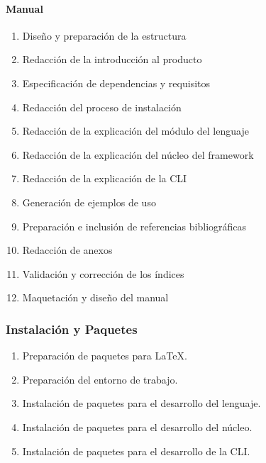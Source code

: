 \paragraph{Manual}
\begin{enumerate}
    \item Diseño y preparación de la estructura
    \item Redacción de la introducción al producto
    \item Especificación de dependencias y requisitos
    \item Redacción del proceso de instalación

    \item Redacción de la explicación del módulo del lenguaje
    \item Redacción de la explicación del núcleo del framework
    \item Redacción de la explicación de la CLI

    \item Generación de ejemplos de uso %

    \item Preparación e inclusión de referencias bibliográficas %
    \item Redacción de anexos %
    \item Validación y corrección de los índices %
    \item Maquetación y diseño del manual %

\end{enumerate}

\subsubsection{Instalación y Paquetes}
\begin{enumerate}
    \item Preparación de paquetes para LaTeX.
    \item Preparación del entorno de trabajo.
    \item Instalación de paquetes para el desarrollo del lenguaje.
    \item Instalación de paquetes para el desarrollo del núcleo.
    \item Instalación de paquetes para el desarrollo de la CLI.
\end{enumerate}








